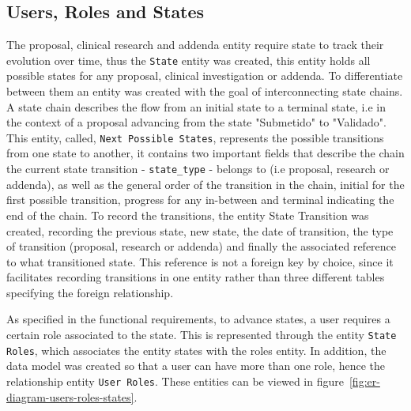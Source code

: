 \subsection{Users, Roles and States}
The proposal, clinical research and addenda entity require state to track their evolution over time, thus the \lstinline{State} entity was created, this entity holds all possible states for any proposal, clinical investigation or addenda. To differentiate between them an entity was created with the goal of interconnecting state chains. A state chain describes the flow from an initial state to a terminal state, i.e in the context of a proposal advancing from the state "Submetido" to "Validado". This entity, called, \lstinline[keywordstyle=\color{black},commentstyle=\color{black},stringstyle=\color{black}]{Next Possible States}, represents the possible transitions from one state to another, it contains two important fields that describe the chain the current state transition - \lstinline{state_type} - belongs to (i.e proposal, research or addenda), as well as the general order of the transition in the chain, initial for the first possible transition, progress for any in-between and terminal indicating the end of the chain.
To record the transitions, the entity State Transition was created, recording the previous state, new state, the date of transition, the type of transition (proposal, research or addenda) and finally the associated reference to what transitioned state. This reference is not a foreign key by choice, since it facilitates recording transitions in one entity rather than three different tables specifying the foreign relationship. 

As specified in the functional requirements, to advance states, a user requires a certain role associated to the state. This is represented through the entity \lstinline{State Roles}, which associates the entity states with the roles entity. In addition, the data model was created so that a user can have more than one role, hence the relationship entity \lstinline{User Roles}.
These entities can be viewed in figure~\ref{fig:er-diagram-users-roles-states}.


